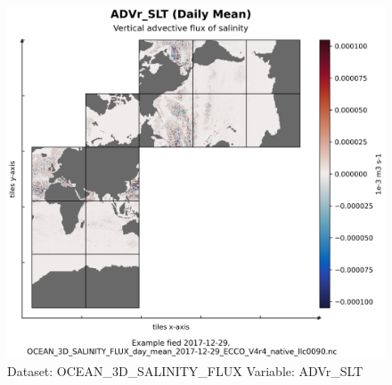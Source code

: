 \begin{figure}[H]
\centering
\includegraphics[width=\textwidth]{../images/plots/native_plots/Ocean_Three-Dimensional_Salinity_Fluxes/ADVr_SLT.png}
\caption{Dataset: OCEAN\_3D\_SALINITY\_FLUX Variable: ADVr\_SLT}
\label{tab:table-OCEAN_3D_SALINITY_FLUX_ADVr_SLT-Plot}
\end{figure}
\pagebreak

